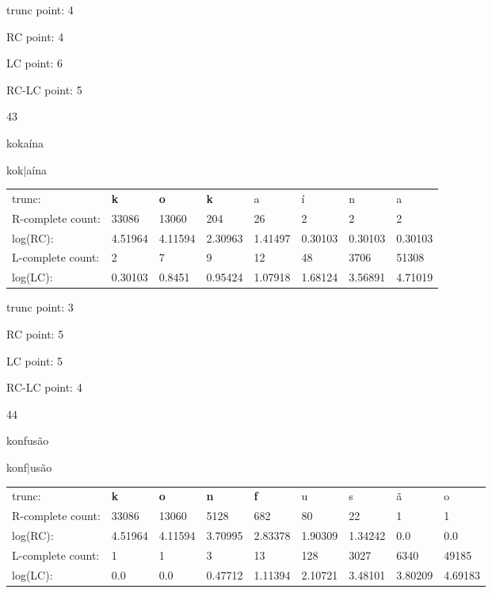 \documentclass{article}
\begin{document}
trunc point: 4

RC point: 4

LC point: 6

RC-LC point: 5

\vspace{3em}



43

kokaína

kok$|$aína

\vspace{1em}

\begin{tabular}{l|lllllll}

trunc: & {\color{red}\bf k} & {\color{red}\bf o} & {\color{red}\bf k} & a & í & n & a \\ 
R-complete count: & 33086 & 13060 & 204 & 26 & 2 & 2 & 2 \\ 
log(RC): & 4.51964 & 4.11594 & 2.30963 & 1.41497 & 0.30103 & 0.30103 & 0.30103 \\ 
L-complete count: & 2 & 7 & 9 & 12 & 48 & 3706 & 51308 \\ 
log(LC): & 0.30103 & 0.8451 & 0.95424 & 1.07918 & 1.68124 & 3.56891 & 4.71019 \\ 
\end{tabular}

trunc point: 3

RC point: 5

LC point: 5

RC-LC point: 4

\vspace{3em}



44

konfusão

konf$|$usão

\vspace{1em}

\begin{tabular}{l|llllllll}

trunc: & {\color{red}\bf k} & {\color{red}\bf o} & {\color{red}\bf n} & {\color{red}\bf f} & u & s & ã & o \\ 
R-complete count: & 33086 & 13060 & 5128 & 682 & 80 & 22 & 1 & 1 \\ 
log(RC): & 4.51964 & 4.11594 & 3.70995 & 2.83378 & 1.90309 & 1.34242 & 0.0 & 0.0 \\ 
L-complete count: & 1 & 1 & 3 & 13 & 128 & 3027 & 6340 & 49185 \\ 
log(LC): & 0.0 & 0.0 & 0.47712 & 1.11394 & 2.10721 & 3.48101 & 3.80209 & 4.69183 \\ 
\end{tabular}
\end{document}
